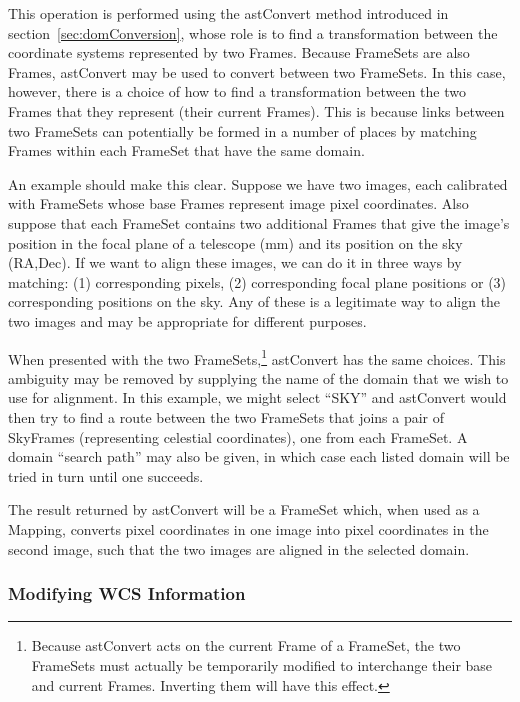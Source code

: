 \documentclass[final,authoryear,5p,times,twocolumn]{elsarticle}
\begin{document}
This operation is performed using the astConvert method introduced in
section~\ref{sec:domConversion}, whose role is to find a transformation
between the coordinate systems represented by two Frames. Because
FrameSets are also Frames, astConvert may be used to convert between two
FrameSets. In this case, however, there is a choice of how to find a
transformation between the two Frames that they represent (their current
Frames). This is because links between two FrameSets can potentially be
formed in a number of places by matching Frames within each FrameSet that
have the same domain.

An example should make this clear. Suppose we have two images, each
calibrated with FrameSets whose base Frames represent image pixel
coordinates. Also suppose that each FrameSet contains two additional
Frames that give the image's position in the focal plane of a telescope
(mm) and its position on the sky (RA,Dec). If we want to align these
images, we can do it in three ways by matching: (1) corresponding pixels,
(2) corresponding focal plane positions or (3) corresponding positions on
the sky. Any of these is a legitimate way to align the two images and may
be appropriate for different purposes.

When presented with the two FrameSets,\footnote{Because astConvert acts
on the current Frame of a FrameSet, the two FrameSets must actually be
temporarily modified to interchange their base and current Frames.
Inverting them will have this effect.} astConvert has the same
choices. This ambiguity may be removed by supplying the name of the
domain that we wish to use for alignment. In this example, we might
select ``SKY'' and astConvert would then try to find a route between the
two FrameSets that joins a pair of SkyFrames (representing celestial
coordinates), one from each FrameSet. A domain ``search path'' may also be
given, in which case each listed domain will be tried in turn until one
succeeds.

The result returned by astConvert will be a FrameSet which, when used as
a Mapping, converts pixel coordinates in one image into pixel coordinates
in the second image, such that the two images are aligned in the selected
domain.

\subsubsection{Modifying WCS Information}
\end{document}
